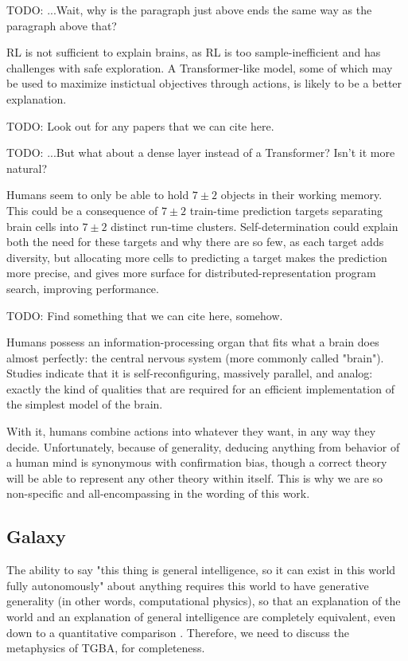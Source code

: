 \documentclass{article}
\begin{document}
    TODO: ...Wait, why is the paragraph just above ends the same way as the paragraph above that?

RL is not sufficient to explain brains, as RL is too sample-inefficient and has challenges with safe exploration. A Transformer-like model, some of which may be used to maximize instictual objectives through actions, is likely to be a better explanation.

    TODO: Look out for any papers that we can cite here.

    TODO: ...But what about a dense layer instead of a Transformer? Isn't it more natural?

Humans seem to only be able to hold $7\pm2$ objects in their working memory. This could be a consequence of $7\pm2$ train-time prediction targets separating brain cells into $7\pm2$ distinct run-time clusters. Self-determination could explain both the need for these targets and why there are so few, as each target adds diversity, but allocating more cells to predicting a target makes the prediction more precise, and gives more surface for distributed-representation program search, improving performance.

    TODO: Find something that we can cite here, somehow.

Humans possess an information-processing organ that fits what a brain does almost perfectly: the central nervous system (more commonly called "brain"). Studies indicate that it is self-reconfiguring, massively parallel, and analog: exactly the kind of qualities that are required for an efficient implementation of the simplest model of the brain.

With it, humans combine actions into whatever they want, in any way they decide. Unfortunately, because of generality, deducing anything from behavior of a human mind is synonymous with confirmation bias, though a correct theory will be able to represent any other theory within itself. This is why we are so non-specific and all-encompassing in the wording of this work.

\subsection{Galaxy}

The ability to say "this thing is general intelligence, so it can exist in this world fully autonomously" about anything requires this world to have generative generality (in other words, computational physics), so that an explanation of the world and an explanation of general intelligence are completely equivalent, even down to a quantitative comparison \cite{10.3389/fphy.2020.525731}. Therefore, we need to discuss the metaphysics of TGBA, for completeness.
\end{document}

